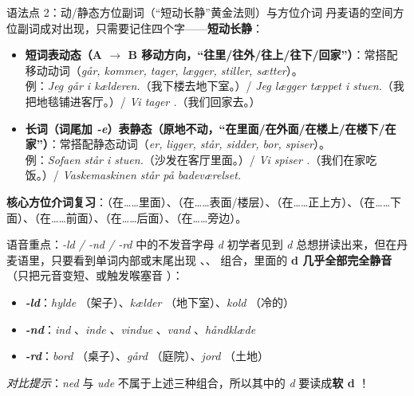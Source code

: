 \begin{grammatikbox}{语法点 2：动/静态方位副词（“短动长静”黄金法则）与方位介词}
丹麦语的空间方位副词成对出现，只需要记住四个字——\textbf{\color{NCDRed}短动长静}：
\begin{itemize}
  \item \textbf{短词表动态（A $\rightarrow$ B 移动方向，“往里/往外/往上/往下/回家”）}：常搭配移动动词（\textit{går, kommer, tager, lægger, stiller, sætter}）。\\
    例：\textit{Jeg går  i kælderen.}（我下楼去地下室。）/ \textit{Jeg lægger tæppet  i stuen.}（我把地毯铺进客厅。）/ \textit{Vi tager .}（我们回家去。）
  \item \textbf{长词（词尾加 \textit{-e}）表静态（原地不动，“在里面/在外面/在楼上/在楼下/在家”）}：常搭配静态动词（\textit{er, ligger, står, sidder, bor, spiser}）。\\
    例：\textit{Sofaen står  i stuen.}（沙发在客厅里面。）/ \textit{Vi spiser .}（我们在家吃饭。）/ \textit{Vaskemaskinen står  på badeværelset.}
\end{itemize}

\textbf{核心方位介词复习}：（在……里面）、（在……表面/楼层）、（在……正上方）、（在……下面）、（在……前面）、（在……后面）、（在……旁边）。
\end{grammatikbox}

\begin{grammatikbox}{语音重点：\textit{-ld / -nd / -rd} 中的不发音字母 \textit{d}}
初学者见到 \textit{d} 总想拼读出来，但在丹麦语里，只要看到单词内部或末尾出现 、、 组合，里面的 \textbf{d 几乎全部完全静音}（只把元音变短、或触发喉塞音 ）：
\begin{itemize}
  \item \textbf{\textit{-ld}}：\textit{hylde} （架子）、\textit{kælder} （地下室）、\textit{kold} （冷的）
  \item \textbf{\textit{-nd}}：\textit{ind} 、\textit{inde} 、\textit{vindue} 、\textit{vand} 、\textit{håndklæde} 
  \item \textbf{\textit{-rd}}：\textit{bord} （桌子）、\textit{gård} （庭院）、\textit{jord} （土地）
\end{itemize}
\textit{对比提示}：\textit{ned}  与 \textit{ude}  不属于上述三种组合，所以其中的 \textit{d} 要读成\textbf{软 d }！
\end{grammatikbox}

